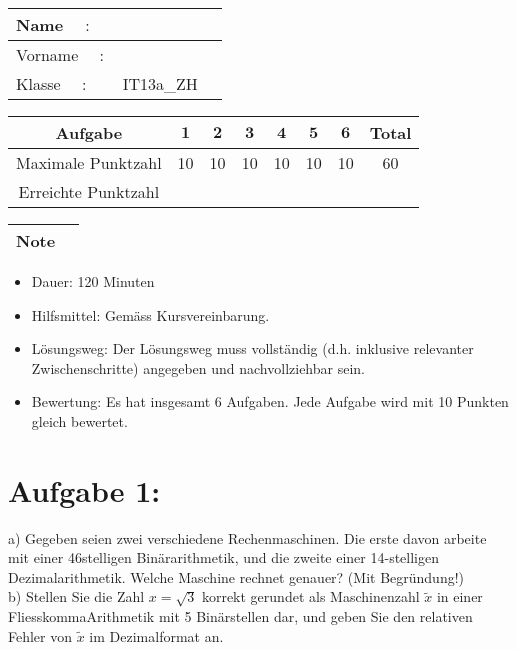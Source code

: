 \documentclass[10pt]{article}
\begin{document}
\begin{center}
\begin{tabular}{|ll|l|}
\hline
Name $\quad:$ &  \\
\hline
Vorname $\quad:$ &  \\
\hline
Klasse $\quad:$ & IT13a\_ZH \\
\hline
\end{tabular}
\end{center}

\begin{center}
\begin{tabular}{|c|c|c|c|c|c|c|c|}
\hline
Aufgabe & $\mathbf{1}$ & $\mathbf{2}$ & $\mathbf{3}$ & $\mathbf{4}$ & $\mathbf{5}$ & $\mathbf{6}$ & Total \\
\hline\hline
Maximale Punktzahl & 10 & 10 & 10 & 10 & 10 & 10 & 60 \\
\hline
Erreichte Punktzahl &  &  &  &  &  &  &  \\
\hline
\end{tabular}
\end{center}

\begin{center}
\begin{tabular}{|l|l|}
\hline
Note &  \\
\hline
\end{tabular}
\end{center}

\begin{itemize}
  \item Dauer: 120 Minuten
  \item Hilfsmittel: Gemäss Kursvereinbarung.
  \item Lösungsweg: Der Lösungsweg muss vollständig (d.h. inklusive relevanter Zwischenschritte) angegeben und nachvollziehbar sein.
  \item Bewertung: Es hat insgesamt 6 Aufgaben. Jede Aufgabe wird mit 10 Punkten gleich bewertet.
\end{itemize}

\section*{Aufgabe 1:}
a) Gegeben seien zwei verschiedene Rechenmaschinen. Die erste davon arbeite mit einer 46stelligen Binärarithmetik, und die zweite einer 14-stelligen Dezimalarithmetik. Welche Maschine rechnet genauer? (Mit Begründung!)\\
b) Stellen Sie die Zahl $x=\sqrt{3}$ korrekt gerundet als Maschinenzahl $\tilde{x}$ in einer FliesskommaArithmetik mit 5 Binärstellen dar, und geben Sie den relativen Fehler von $\tilde{x}$ im Dezimalformat an.
\end{document}

